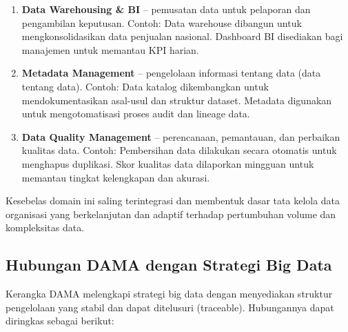 \begin{enumerate}
	\item \textbf{Data Warehousing \& BI} – pemusatan data untuk pelaporan dan pengambilan keputusan. Contoh: Data warehouse dibangun untuk mengkonsolidasikan data penjualan nasional. Dashboard BI disediakan bagi manajemen untuk memantau KPI harian.
	
	\item \textbf{Metadata Management} – pengelolaan informasi tentang data (data tentang data). Contoh: Data katalog dikembangkan untuk mendokumentasikan asal-usul dan struktur dataset. Metadata digunakan untuk mengotomatisasi proses audit dan lineage data.
	
	\item \textbf{Data Quality Management} – perencanaan, pemantauan, dan perbaikan kualitas data. Contoh: Pembersihan data dilakukan secara otomatis untuk menghapus duplikasi. Skor kualitas data dilaporkan mingguan untuk memantau tingkat kelengkapan dan akurasi.
\end{enumerate}


Kesebelas domain ini saling terintegrasi dan membentuk dasar tata kelola data organisasi yang berkelanjutan dan adaptif terhadap pertumbuhan volume dan kompleksitas data.

\subsection{Hubungan DAMA dengan Strategi Big Data}

Kerangka DAMA melengkapi strategi big data dengan menyediakan struktur pengelolaan yang stabil dan dapat ditelusuri (traceable). Hubungannya dapat diringkas sebagai berikut:

